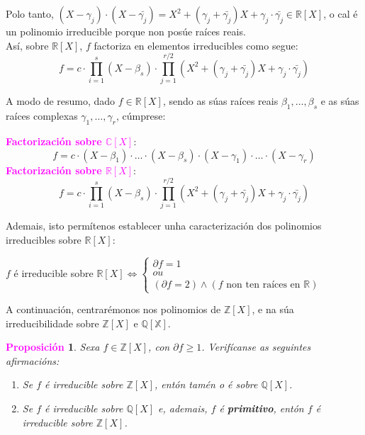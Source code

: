 \documentclass[twoside]{report}
\newcommand{\magbf}[1]{\textcolor{magenta}{\textbf{#1}}} %
\theoremstyle{mystyle}
\newtheorem{prop}{\magbf{Proposición}}[chapter]
\newenvironment{proposition}
{\begin{mdframed}[linecolor = magenta,backgroundcolor = classicrose, linewidth = 2mm]\begin{prop}}
{\end{prop}\end{mdframed}}
\begin{document}
\pagebreak

\noindent Polo tanto, $(X - \gamma_{j}) \cdot (X - \bar{\gamma_{j}}) = X^{2} + (\gamma_{j} + \bar{\gamma_{j}})X + \gamma_{j} \cdot \bar{\gamma_{j}} \in \mathbb{R}[X]$, o cal é un polinomio irreducible porque non posúe raíces reais.\\

\noindent Así, sobre $\mathbb{R}[X]$, $f$ factoriza en elementos irreducibles como segue:
$$f = c \cdot \prod_{i = 1}^{s}(X - \beta_{s}) \cdot \prod_{j = 1}^{r/2}(X^{2} + (\gamma_{j} + \bar{\gamma_{j}})X + \gamma_{j} \cdot \bar{\gamma_{j}})$$

\noindent A modo de resumo, dado $f \in \mathbb{R}[X]$, sendo as súas raíces reais $\beta_{1}, \ldots, \beta_{s}$ e as súas raíces complexas $\gamma_{1}, \ldots, \gamma_{r}$, cúmprese:

\begin{mdframed}[linecolor = classicrose, linewidth = 1mm]
\noindent \magbf{Factorización sobre $\mathbb{C}[X]$}:
$$f = c \cdot (X - \beta_{1}) \cdot \ldots \cdot (X - \beta_{s}) \cdot (X - \gamma_{1}) \cdot \ldots \cdot (X - \gamma_{r})$$
\noindent \magbf{Factorización sobre $\mathbb{R}[X]$}:
$$f = c \cdot \prod_{i = 1}^{s}(X - \beta_{s}) \cdot \prod_{j = 1}^{r/2}(X^{2} + (\gamma_{j} + \bar{\gamma_{j}})X + \gamma_{j} \cdot \bar{\gamma_{j}})$$
\end{mdframed}

\noindent Ademais, isto permítenos establecer unha caracterización dos polinomios irreducibles sobre $\mathbb{R}[X]$:
\begin{center}
    $f$ é irreducible sobre $\mathbb{R}[X] \Longleftrightarrow \begin{cases}
    \partial f = 1\\
    ou\\
    (\partial f = 2)\wedge(f \text{ non ten raíces en } \mathbb{R})
    \end{cases}$
\end{center}

\vspace{5mm}

\noindent A continuación, centrarémonos nos polinomios de $\mathbb{Z}[X]$, e na súa irreducibilidade sobre $\mathbb{Z}[X]$ e $\mathbb{Q[X]}$.\\

\vspace{2mm}

\begin{proposition}\label{prop2.24}
Sexa $f \in \mathbb{Z}[X]$, con $\partial f \geq 1$. Verifícanse as seguintes afirmacións:
\begin{enumerate}
    \item Se $f$ é irreducible sobre $\mathbb{Z}[X]$, entón tamén o é sobre $\mathbb{Q}[X]$.
    \item Se $f$ é irreducible sobre $\mathbb{Q}[X]$ e, ademais, $f$ é \textbf{primitivo}, entón $f$ é irreducible sobre $\mathbb{Z}[X]$.
\end{enumerate} 
\end{proposition}
\end{document}
